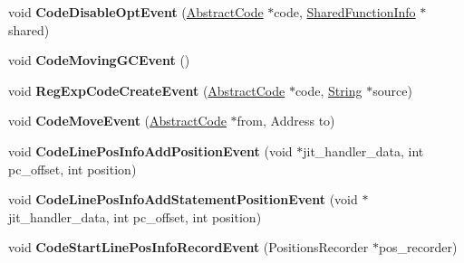\begin{DoxyCompactItemize}
\item 
void {\bfseries Code\+Disable\+Opt\+Event} (\hyperlink{classv8_1_1internal_1_1_abstract_code}{Abstract\+Code} $\ast$code, \hyperlink{classv8_1_1internal_1_1_shared_function_info}{Shared\+Function\+Info} $\ast$shared)\hypertarget{classv8_1_1internal_1_1_logger_a170f0c032f343edf0689de06f2336037}{}\label{classv8_1_1internal_1_1_logger_a170f0c032f343edf0689de06f2336037}

\item 
void {\bfseries Code\+Moving\+G\+C\+Event} ()\hypertarget{classv8_1_1internal_1_1_logger_a45517be4c0f8a6707c6a9973b8e7f3df}{}\label{classv8_1_1internal_1_1_logger_a45517be4c0f8a6707c6a9973b8e7f3df}

\item 
void {\bfseries Reg\+Exp\+Code\+Create\+Event} (\hyperlink{classv8_1_1internal_1_1_abstract_code}{Abstract\+Code} $\ast$code, \hyperlink{classv8_1_1internal_1_1_string}{String} $\ast$source)\hypertarget{classv8_1_1internal_1_1_logger_a8117a67ed302dfdaa49159027ed921b2}{}\label{classv8_1_1internal_1_1_logger_a8117a67ed302dfdaa49159027ed921b2}

\item 
void {\bfseries Code\+Move\+Event} (\hyperlink{classv8_1_1internal_1_1_abstract_code}{Abstract\+Code} $\ast$from, Address to)\hypertarget{classv8_1_1internal_1_1_logger_adab10ce8a3a659ba53e877a39f42f059}{}\label{classv8_1_1internal_1_1_logger_adab10ce8a3a659ba53e877a39f42f059}

\item 
void {\bfseries Code\+Line\+Pos\+Info\+Add\+Position\+Event} (void $\ast$jit\+\_\+handler\+\_\+data, int pc\+\_\+offset, int position)\hypertarget{classv8_1_1internal_1_1_logger_a5c4568776f8915aea5cc7a132894b80f}{}\label{classv8_1_1internal_1_1_logger_a5c4568776f8915aea5cc7a132894b80f}

\item 
void {\bfseries Code\+Line\+Pos\+Info\+Add\+Statement\+Position\+Event} (void $\ast$jit\+\_\+handler\+\_\+data, int pc\+\_\+offset, int position)\hypertarget{classv8_1_1internal_1_1_logger_a651db265581770a497a0e155583056cb}{}\label{classv8_1_1internal_1_1_logger_a651db265581770a497a0e155583056cb}

\item 
void {\bfseries Code\+Start\+Line\+Pos\+Info\+Record\+Event} (Positions\+Recorder $\ast$pos\+\_\+recorder)\hypertarget{classv8_1_1internal_1_1_logger_ab545536446713c559e666a814c637c76}{}\label{classv8_1_1internal_1_1_logger_ab545536446713c559e666a814c637c76}


\end{DoxyCompactItemize}
